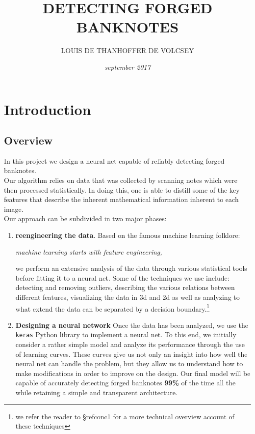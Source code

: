 \documentclass[14pt]{article}
\theoremstyle{plain}
\theoremstyle{definition}
\begin{document}
\title{\textbf{DETECTING FORGED BANKNOTES}}
\author{LOUIS DE THANHOFFER DE VOLCSEY}
\date{\emph{september 2017}}
\maketitle	
\vspace{1in}

\pagestyle{fancy}
 \lfoot{}  \cfoot{}

\noindent\hrulefill
\tableofcontents{}
\noindent\hrulefill
\newpage 
\section{Introduction}
\subsection{Overview}
In this project we design a neural net capable of reliably detecting forged banknotes.\\ Our algorithm relies on data that was collected by scanning notes which were then processed statistically. In doing this, one is able to distill some of the key features that describe the inherent mathematical information inherent to each image.\\ 
Our approach can be subdivided in two major phases:
\begin{enumerate}
\item {\bf reengineering the data}. Based on the famous machine learning folklore:
\begin{center}
\emph{machine learning starts with feature engineering,}	
\end{center}
we perform an extensive analysis of the data through various statistical tools before fitting it to a neural net. 
Some of the techniques we use include:  detecting and removing outliers, describing the various relations between different features, visualizing the data in  3d and 2d  as well as analyzing to what extend the data can be separated by a decision boundary.\footnote{we refer the reader to \S ref{conc1} for a more technical overview account of these techniques }
\item
{\bf Designing a neural network}
Once the data has been analyzed, we use the \texttt{keras} Python library to implement a neural net. To this end, we initially consider a rather simple model and analyze its performance through the use of learning curves. These curves give us not only an insight into how well the neural net can handle the problem, but they allow us to understand how to make modifications in order to improve on the design. Our final model will be capable of  accurately detecting forged banknotes {\bf 99\%} of the time all the while retaining a simple and transparent architecture.
\end{enumerate}
\end{document}
